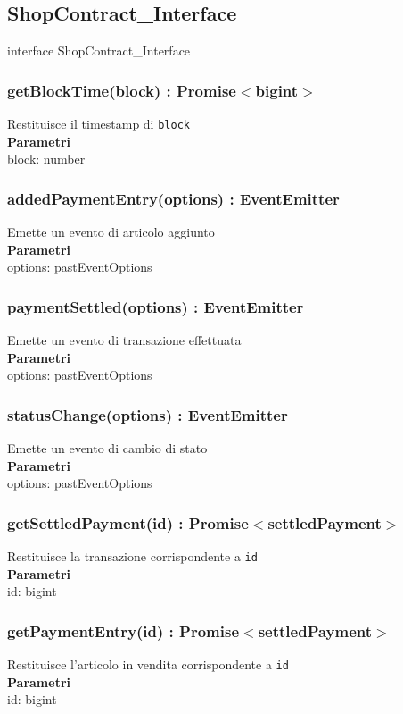 \documentclass[a4paper, 12pt]{article}
\begin{document}
\subsection{ShopContract\_Interface}
interface ShopContract\_Interface
\subsubsection{getBlockTime(block) : Promise$<$bigint$>$}
Restituisce il timestamp di \texttt{block}\\
\textbf{Parametri}\\
block: number\\
\subsubsection{addedPaymentEntry(options) : EventEmitter}
Emette un evento di articolo aggiunto\\
\textbf{Parametri}\\
options: pastEventOptions
\subsubsection{paymentSettled(options) : EventEmitter}
Emette un evento di transazione effettuata\\
\textbf{Parametri}\\
options: pastEventOptions
\subsubsection{statusChange(options) : EventEmitter}
Emette un evento di cambio di stato\\
\textbf{Parametri}\\
options: pastEventOptions
\subsubsection{getSettledPayment(id) : Promise$<$settledPayment$>$}
Restituisce la transazione corrispondente a \texttt{id}\\
\textbf{Parametri}\\
id: bigint
\subsubsection{getPaymentEntry(id) : Promise$<$settledPayment$>$}
Restituisce l'articolo in vendita corrispondente a \texttt{id}\\
\textbf{Parametri}\\
id: bigint
\end{document}
